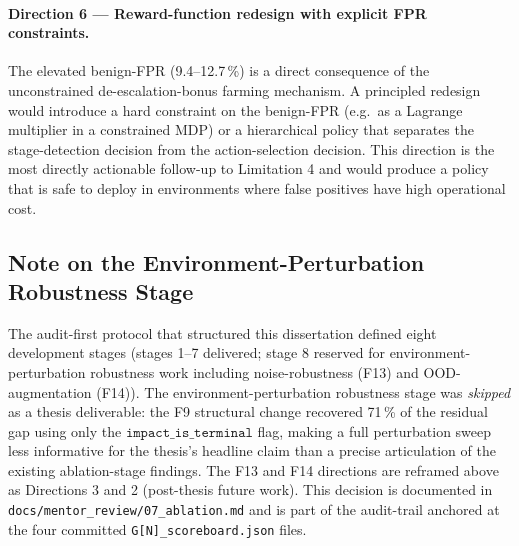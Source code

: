 \paragraph{Direction 6 --- Reward-function redesign with explicit FPR constraints.} The elevated benign-FPR (9.4--12.7\,\%) is a direct consequence of the unconstrained de-escalation-bonus farming mechanism. A principled redesign would introduce a hard constraint on the benign-FPR (e.g.\ as a Lagrange multiplier in a constrained MDP) or a hierarchical policy that separates the stage-detection decision from the action-selection decision. This direction is the most directly actionable follow-up to Limitation 4 and would produce a policy that is safe to deploy in environments where false positives have high operational cost.

\subsection{Note on the Environment-Perturbation Robustness Stage}
The audit-first protocol that structured this dissertation defined eight development stages (stages 1--7 delivered; stage 8 reserved for environment-perturbation robustness work including noise-robustness (F13) and OOD-augmentation (F14)). The environment-perturbation robustness stage was \emph{skipped} as a thesis deliverable: the F9 structural change recovered 71\,\% of the residual gap using only the $\texttt{impact\_is\_terminal}$ flag, making a full perturbation sweep less informative for the thesis's headline claim than a precise articulation of the existing ablation-stage findings. The F13 and F14 directions are reframed above as Directions 3 and 2 (post-thesis future work). This decision is documented in \texttt{docs/mentor\_review/07\_ablation.md} and is part of the audit-trail anchored at the four committed \texttt{G[N]\_scoreboard.json} files.
